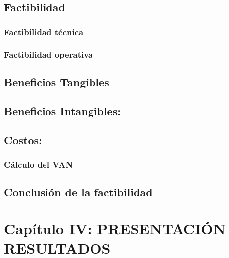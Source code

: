 \documentclass[
]{article}
\begin{document}
\hypertarget{factibilidad}{%
\subsection{Factibilidad}\label{factibilidad}}

\hypertarget{factibilidad-tuxe9cnica}{%
\subsubsection{Factibilidad técnica}\label{factibilidad-tuxe9cnica}}

\hypertarget{factibilidad-operativa}{%
\subsubsection{Factibilidad operativa}\label{factibilidad-operativa}}

\hypertarget{beneficios-tangibles}{%
\subsection{Beneficios Tangibles}\label{beneficios-tangibles}}

\hypertarget{beneficios-intangibles}{%
\subsection{Beneficios Intangibles:}\label{beneficios-intangibles}}

\hypertarget{costos}{%
\subsection{Costos:}\label{costos}}

\hypertarget{cuxe1lculo-del-van}{%
\subsubsection{Cálculo del VAN}\label{cuxe1lculo-del-van}}

\hypertarget{conclusiuxf3n-de-la-factibilidad}{%
\subsection{Conclusión de la
factibilidad}\label{conclusiuxf3n-de-la-factibilidad}}

\hypertarget{capuxedtulo-iv-presentaciuxf3n-resultados}{%
\section{Capítulo IV: PRESENTACIÓN
RESULTADOS}\label{capuxedtulo-iv-presentaciuxf3n-resultados}}
\end{document}
